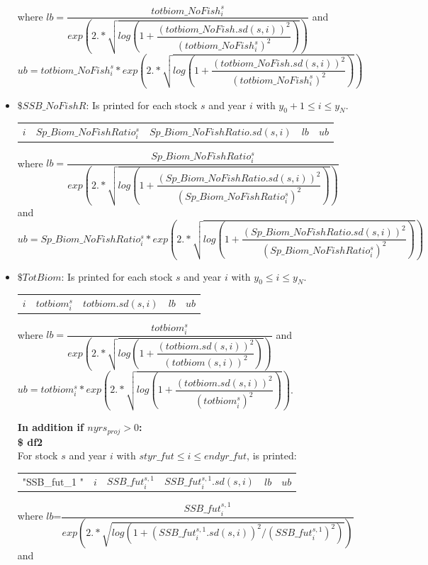 \documentclass{article}
\begin{document}
\begin{itemize}
\begin{center}
\begin{tabular}{c c c c c}
\end{tabular}
\end{center}
where
$ lb=\dfrac{totbiom\_NoFish^s_i}{exp\left(2.*\sqrt{log\left(1+\dfrac{(totbiom\_NoFish.sd(s,i))^2}{(totbiom\_NoFish^s_i)^2}\right)}\right)}$ and\\
$ub=totbiom\_NoFish^s_i*exp\left(2.*\sqrt{log\left(1+\dfrac{(totbiom\_NoFish.sd(s,i))^2}{(totbiom\_NoFish^s_i)^2}\right)}\right)$

\item $\$ SSB\_NoFishR$: Is printed for each stock $s$ and year $i$ with $y_0 +1\leq i \leq y_N$.
\begin{center}
\begin{tabular}{c c c c c}
  $i$   &  $Sp\_Biom\_NoFishRatio^s_i$ & $Sp\_Biom\_NoFishRatio.sd(s,i)$ & $lb$ & $ub$ \\
      
\end{tabular}
\end{center}
where 
$lb=\dfrac{Sp\_Biom\_NoFishRatio^s_i}{exp\left(2.*\sqrt{log\left(1+\dfrac{(Sp\_Biom\_NoFishRatio.sd(s,i))^2}{(Sp\_Biom\_NoFishRatio^s_i)^2}\right)}\right)}$ and \\
$ub=Sp\_Biom\_NoFishRatio^s_i*exp\left(2.*\sqrt{log\left(1+\dfrac{(Sp\_Biom\_NoFishRatio.sd(s,i))^2}{(Sp\_Biom\_NoFishRatio^s_i)^2}\right)}\right)$

\item  $\$ TotBiom$: Is printed for each stock $s$ and year $i$ with $y_0 \leq i \leq y_N$.
\begin{center}
\begin{tabular}{c c c c c}
  $i$   &  $totbiom^s_i$ & $totbiom.sd(s,i)$ & $lb$ & $ub$ \\
      
\end{tabular}
\end{center}
where 
$lb=\dfrac{totbiom^s_i}{exp\left(2.*\sqrt{log\left(1+\dfrac{(totbiom.sd(s,i))^2}{(totbiom(s,i))^2}\right)}\right)}$ and \\
$ub=totbiom^s_i*exp\left(2.*\sqrt{log\left(1+\dfrac{(totbiom.sd(s,i))^2}{(totbiom^s_i)^2}\right)}\right)$.



\textbf{In addition if $nyrs_{proj}>0$:}\\

\textbf{\$ df2}\\
For stock $s$ and year $i$ with $styr\_fut\leq  i \leq endyr\_fut$, is printed:
\begin{center}
    \begin{tabular}{c c c c c c}
"SSB\_fut\_1 "    & $i$ &  $SSB\_fut^{s,1}_i$ & $SSB\_fut^{s,1}_i.sd(s,i)$ & $lb$ & $ub$\\ \end{tabular}
\end{center}
where $lb$=$\dfrac{SSB\_fut^{s,1}_i}{exp\left(2.*\sqrt{log(1+{(SSB\_fut^{s,1}_i.sd(s,i))}^2/{(SSB\_fut^{s,1}_i)}^2)}\right)}$ and \\


\end{itemize}
\end{document}
